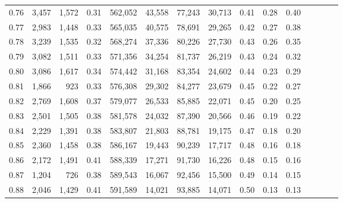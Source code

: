 \begin{tabular}{rrrcrrrrrrrrrrr}
0.76 &   3,457 &  1,572 &                                       0.31 &  562,052 &   43,558 &   77,243 &   30,713 &  0.41 &  0.28 &                         0.40 \\
0.77 &   2,983 &  1,448 &                                       0.33 &  565,035 &   40,575 &   78,691 &   29,265 &  0.42 &  0.27 &                         0.38 \\
0.78 &   3,239 &  1,535 &                                       0.32 &  568,274 &   37,336 &   80,226 &   27,730 &  0.43 &  0.26 &                         0.35 \\
0.79 &   3,082 &  1,511 &                                       0.33 &  571,356 &   34,254 &   81,737 &   26,219 &  0.43 &  0.24 &                         0.32 \\
0.80 &   3,086 &  1,617 &                                       0.34 &  574,442 &   31,168 &   83,354 &   24,602 &  0.44 &  0.23 &                         0.29 \\
0.81 &   1,866 &    923 &                                       0.33 &  576,308 &   29,302 &   84,277 &   23,679 &  0.45 &  0.22 &                         0.27 \\
0.82 &   2,769 &  1,608 &                                       0.37 &  579,077 &   26,533 &   85,885 &   22,071 &  0.45 &  0.20 &                         0.25 \\
0.83 &   2,501 &  1,505 &                                       0.38 &  581,578 &   24,032 &   87,390 &   20,566 &  0.46 &  0.19 &                         0.22 \\
0.84 &   2,229 &  1,391 &                                       0.38 &  583,807 &   21,803 &   88,781 &   19,175 &  0.47 &  0.18 &                         0.20 \\
0.85 &   2,360 &  1,458 &                                       0.38 &  586,167 &   19,443 &   90,239 &   17,717 &  0.48 &  0.16 &                         0.18 \\
0.86 &   2,172 &  1,491 &                                       0.41 &  588,339 &   17,271 &   91,730 &   16,226 &  0.48 &  0.15 &                         0.16 \\
0.87 &   1,204 &    726 &                                       0.38 &  589,543 &   16,067 &   92,456 &   15,500 &  0.49 &  0.14 &                         0.15 \\
0.88 &   2,046 &  1,429 &                                       0.41 &  591,589 &   14,021 &   93,885 &   14,071 &  0.50 &  0.13 &                         0.13 \\

\end{tabular}
